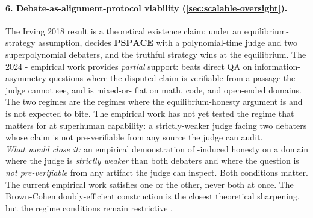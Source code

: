 \paragraph{6. Debate-as-alignment-protocol viability (\cref{sec:scalable-oversight}).}
The Irving 2018 result \citep[Theorem 1]{irving2018-debate} is a
theoretical existence claim: under an equilibrium-strategy
assumption,  decides $\mathbf{PSPACE}$ with a
polynomial-time judge and two superpolynomial debaters, and the
truthful strategy wins at the equilibrium. The 2024 -
empirical work \citep{khan2024-debating-llms} provides
\emph{partial} support:  beats direct QA on
information-asymmetry questions where the disputed claim is
verifiable from a passage the judge cannot see, and is mixed-or-
flat on math, code, and open-ended domains. The two regimes are
the regimes where the equilibrium-honesty argument is and is not
expected to bite. The empirical work has not yet tested the
regime that matters for  at superhuman
capability: a strictly-weaker judge facing two debaters whose
claim is not pre-verifiable from any source the judge can audit.\\
\emph{What would close it:} an empirical demonstration of
-induced honesty on a domain where the judge is
\emph{strictly weaker} than both debaters and where the question
is \emph{not pre-verifiable} from any artifact the judge can
inspect. Both conditions matter. The current empirical work
satisfies one or the other, never both at once. The Brown-Cohen
doubly-efficient construction is the closest theoretical
sharpening, but the regime conditions remain restrictive
\citep{irving2018-debate, khan2024-debating-llms, burns2023-w2s}.

